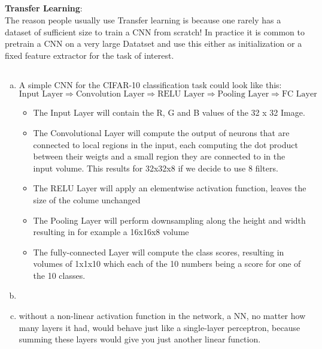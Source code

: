 \documentclass[12pt]{article}
\begin{document}
\subsection{ }

\textbf{Transfer Learning}:\\
The reason people usually use Transfer learning is because one rarely has a dataset of sufficient size to train a CNN from scratch! In practice it is common to pretrain a CNN on a very large Datatset and use this either as initialization or a fixed feature extractor for the task of interest.


\subsection{ }
\begin{enumerate}[a)]
    \item 
        A simple CNN for the CIFAR-10 classification task could look like this:
        $$ \text{Input Layer} \Rightarrow \text{Convolution Layer} \Rightarrow \text{RELU Layer} \Rightarrow \text{Pooling Layer} \Rightarrow \text{FC Layer}$$

        \begin{itemize}
            \item 
                The Input Layer will contain the R, G and B values of the 32 x 32 Image. 
            \item
                The Convolutional Layer will compute the output of neurons that are connected to local regions in the input, each computing the dot product between their weigts and a small region they are connected to in the input volume. This results for 32x32x8 if we decide to use 8 filters.
            \item
                The RELU Layer will apply an elementwise activation function, leaves the size of the colume unchanged
            \item
                The Pooling Layer will perform downsampling along the height and width resulting in for example a 16x16x8 volume
            \item
                The fully-connected Layer will compute the class scores, resulting in volumes of 1x1x10 which each of the 10 numbers being a score for one of the 10 classes.
        \end{itemize}

    \item


    \item
        without a non-linear activation function in the network, a NN, no matter how many layers it had, would behave just like a single-layer perceptron, because summing these layers would give you just another linear function.\\


\end{enumerate}
\end{document}
